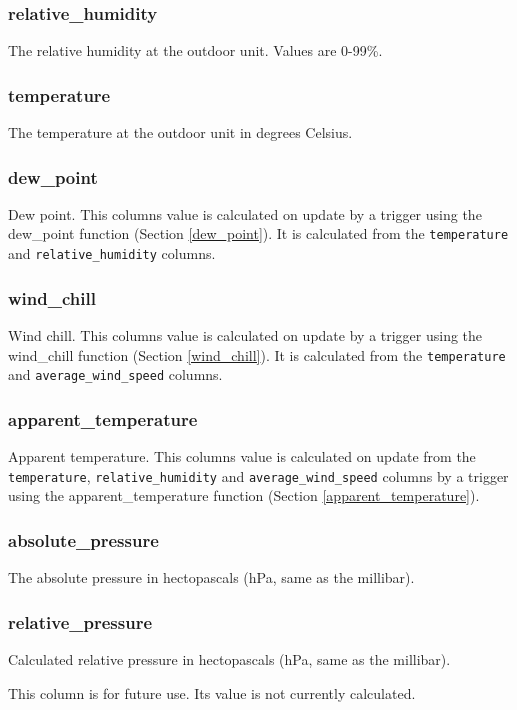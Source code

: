 \documentclass[a4paper,10pt]{book}
\begin{document}
\subsubsection{relative\_humidity}
The relative humidity at the outdoor unit. Values are 0-99\%.

\subsubsection{temperature}
The temperature at the outdoor unit in degrees Celsius.

\subsubsection{dew\_point}
Dew point. This columns value is calculated on update by a trigger using the dew\_point function (Section \ref{dew_point}). It is calculated from the \verb|temperature| and \verb|relative_humidity| columns.

\subsubsection{wind\_chill}
Wind chill. This columns value is calculated on update by a trigger using the wind\_chill function (Section \ref{wind_chill}). It is calculated from the \verb|temperature| and \verb|average_wind_speed| columns.

\subsubsection{apparent\_temperature}
Apparent temperature. This columns value is calculated on update from the \verb|temperature|, \verb|relative_humidity| and \verb|average_wind_speed| columns by a trigger using the apparent\_temperature function (Section \ref{apparent_temperature}).

\subsubsection{absolute\_pressure}
The absolute pressure in hectopascals (hPa, same as the millibar).

\subsubsection{relative\_pressure}
Calculated relative pressure in hectopascals (hPa, same as the millibar).

This column is for future use. Its value is not currently calculated.
\end{document}
